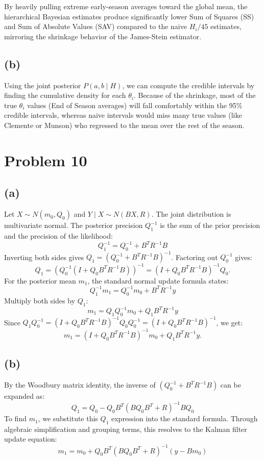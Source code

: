 \documentclass[
  letterpaper,
  DIV=11,
  numbers=noendperiod]{scrartcl}
\begin{document}
By heavily pulling extreme early-season averages toward the global mean,
the hierarchical Bayesian estimates produce significantly lower Sum of
Squares (SS) and Sum of Absolute Values (SAV) compared to the naive
\(H_i/45\) estimates, mirroring the shrinkage behavior of the
James-Stein estimator.

\subsection{(b)}\label{b-6}

Using the joint posterior \(P(a,b \mid H)\), we can compute the credible
intervals by finding the cumulative density for each \(\theta_i\).
Because of the shrinkage, most of the true \(\theta_i\) values (End of
Season averages) will fall comfortably within the 95\% credible
intervals, whereas naive intervals would miss many true values (like
Clemente or Munson) who regressed to the mean over the rest of the
season.

\section{Problem 10}\label{problem-10}

\subsection{(a)}\label{a-7}

Let \(X \sim N(m_0, Q_0)\) and \(Y \mid X \sim N(BX, R)\). The joint
distribution is multivariate normal. The posterior precision
\(Q_1^{-1}\) is the sum of the prior precision and the precision of the
likelihood: \[
Q_1^{-1} = Q_0^{-1} + B^T R^{-1} B
\] Inverting both sides gives \(Q_1 = (Q_0^{-1} + B^T R^{-1} B)^{-1}\).
Factoring out \(Q_0^{-1}\) gives: \[
Q_1 = \left(Q_0^{-1}(I + Q_0 B^T R^{-1} B)\right)^{-1} = (I + Q_0 B^T R^{-1} B)^{-1} Q_0.
\] For the posterior mean \(m_1\), the standard normal update formula
states: \[
Q_1^{-1} m_1 = Q_0^{-1} m_0 + B^T R^{-1} y
\] Multiply both sides by \(Q_1\): \[
m_1 = Q_1 Q_0^{-1} m_0 + Q_1 B^T R^{-1} y
\] Since
\(Q_1 Q_0^{-1} = (I + Q_0 B^T R^{-1} B)^{-1} Q_0 Q_0^{-1} = (I + Q_0 B^T R^{-1} B)^{-1}\),
we get: \[
m_1 = (I + Q_0 B^T R^{-1} B)^{-1} m_0 + Q_1 B^T R^{-1} y.
\]

\subsection{(b)}\label{b-7}

By the Woodbury matrix identity, the inverse of
\((Q_0^{-1} + B^T R^{-1} B)\) can be expanded as: \[
Q_1 = Q_0 - Q_0 B^T (B Q_0 B^T + R)^{-1} B Q_0
\] To find \(m_1\), we substitute this \(Q_1\) expression into the
standard formula. Through algebraic simplification and grouping terms,
this resolves to the Kalman filter update equation: \[
m_1 = m_0 + Q_0 B^T (B Q_0 B^T + R)^{-1} (y - B m_0)
\]
\end{document}
